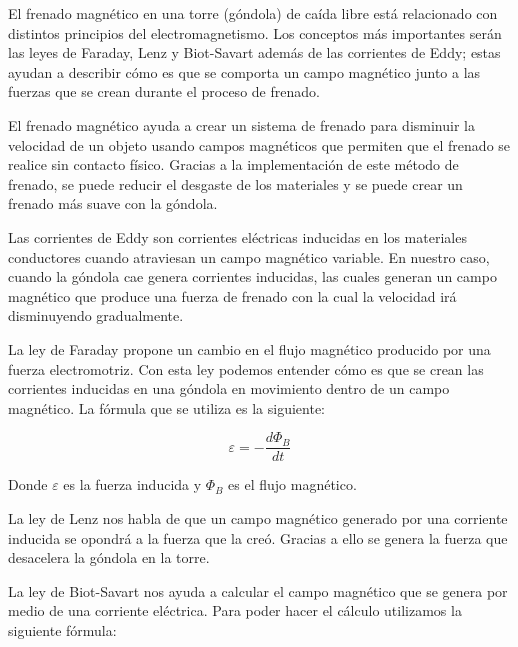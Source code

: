 

\tab El frenado magnético en una torre (góndola) de caída libre está relacionado con distintos principios del electromagnetismo. Los conceptos más importantes serán las leyes de Faraday, Lenz y Biot-Savart además de las corrientes de Eddy; estas ayudan a describir cómo es que se comporta un campo magnético junto a las fuerzas que se crean durante el proceso de frenado.

El frenado magnético ayuda a crear un sistema de frenado para disminuir la velocidad de un objeto usando campos magnéticos que permiten que el frenado se realice sin contacto físico. Gracias a la implementación de este método de frenado, se puede reducir el desgaste de los materiales y se puede crear un frenado más suave con la góndola.


\tab Las corrientes de Eddy son corrientes eléctricas inducidas en los materiales conductores cuando atraviesan un campo magnético variable. En nuestro caso, cuando la góndola cae genera corrientes inducidas, las cuales generan un campo magnético que produce una fuerza de frenado con la cual la velocidad irá disminuyendo gradualmente.


\tab La ley de Faraday propone un cambio en el flujo magnético producido por una fuerza electromotriz. Con esta ley podemos entender cómo es que se crean las corrientes inducidas en una góndola en movimiento dentro de un campo magnético.
La fórmula que se utiliza es la siguiente:

\begin{equation}
    \varepsilon = -\frac{d\Phi_B}{dt}
\end{equation}

Donde $\varepsilon$ es la fuerza inducida y $\Phi_B$ es el flujo magnético.


\tab La ley de Lenz nos habla de que un campo magnético generado por una corriente inducida se opondrá a la fuerza que la creó. Gracias a ello se genera la fuerza que desacelera la góndola en la torre.


\tab La ley de Biot-Savart nos ayuda a calcular el campo magnético que se genera por medio de una corriente eléctrica. Para poder hacer el cálculo utilizamos la siguiente fórmula:

